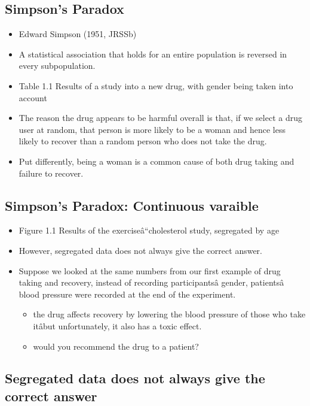 \documentclass[]{article}
\providecommand{\tightlist}{%
  \setlength{\itemsep}{0pt}\setlength{\parskip}{0pt}}
\begin{document}
\subsection{Simpson's Paradox}\label{simpsons-paradox}

\begin{itemize}
\item
  Edward Simpson (1951, JRSSb)
\item
  A statistical association that holds for an entire population is
  reversed in every subpopulation.
\item
  Table 1.1 Results of a study into a new drug, with gender being taken
  into account
\item
  The reason the drug appears to be harmful overall is that, if we
  select a drug user at random, that person is more likely to be a woman
  and hence less likely to recover than a random person who does not
  take the drug.
\item
  Put differently, being a woman is a common cause of both drug taking
  and failure to recover.
\end{itemize}

\subsection{Simpson's Paradox: Continuous
varaible}\label{simpsons-paradox-continuous-varaible}

\begin{itemize}
\item
  Figure 1.1 Results of the exerciseâ``cholesterol study, segregated by
  age
\item
  However, segregated data does not always give the correct answer.
\item
  Suppose we looked at the same numbers from our first example of drug
  taking and recovery, instead of recording participantsâ gender,
  patientsâ blood pressure were recorded at the end of the experiment.

  \begin{itemize}
  \tightlist
  \item
    the drug affects recovery by lowering the blood pressure of those
    who take itâbut unfortunately, it also has a toxic effect.
  \item
    would you recommend the drug to a patient?
  \end{itemize}
\end{itemize}

\subsection{Segregated data does not always give the correct
answer}\label{segregated-data-does-not-always-give-the-correct-answer}
\end{document}
